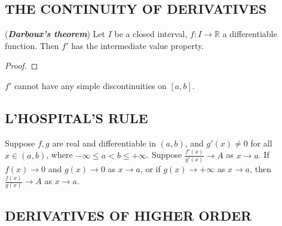 \subsection{THE CONTINUITY OF DERIVATIVES}

\begin{theorem}
(\textbf{\emph{Darboux's theorem}}) Let $I$ be a closed interval, $f:I\to \mathbb{R}$ a differentiable function. Then $f'$ has the intermediate value property.
\end{theorem}
\begin{proof}

\end{proof}

\begin{corollary}
$f'$ cannot have any simple discontinuities on $[a,b]$.
\end{corollary}

\subsection{L'HOSPITAL'S RULE}

\begin{theorem}
Suppose $f,g$ are real and differentiable in $(a,b)$, and $g'(x)\neq 0$ for all $x\in(a,b)$, where $-\infty \leq a<b\leq +\infty$. Suppose $\displaystyle \frac{f'(x)}{g'(x)}\to A$ as $x\to a$. If $f(x)\to 0$ and $g(x)\to 0$ as $x\to a$, or if $g(x)\to +\infty$ as $x\to a$, then $\displaystyle \frac{f(x)}{g(x)}\to A$ as $x\to a$.
\end{theorem}
\begin{hardproof}

\end{hardproof}

\subsection{DERIVATIVES OF HIGHER ORDER}

\begin{definition}

\end{definition}

